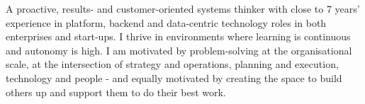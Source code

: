 

\begin{cvparagraph}

A proactive, results- and customer-oriented systems thinker with close to 7 years’ experience in platform,
backend and data-centric technology roles in both enterprises and start-ups. I thrive in environments where
learning is continuous and autonomy is high. I am motivated by problem-solving at the organisational scale,
at the intersection of strategy and operations, planning and execution, technology and people - and equally
motivated by creating the space to build others up and support them to do their best work.
%
\end{cvparagraph}
